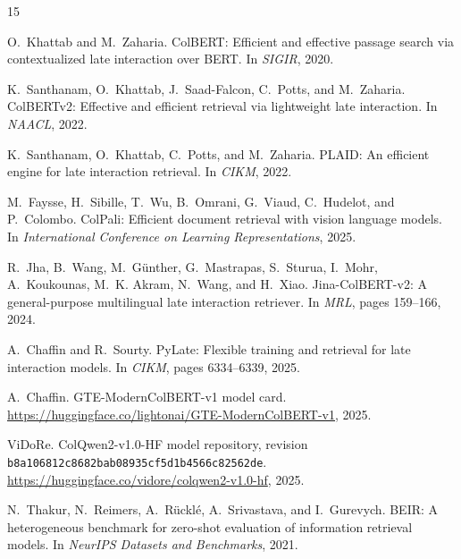 \documentclass{article}
\begin{document}
\begin{thebibliography}{15}

O.~Khattab and M.~Zaharia.
\newblock ColBERT: Efficient and effective passage search via contextualized
late interaction over BERT.
\newblock In \emph{SIGIR}, 2020.

K.~Santhanam, O.~Khattab, J.~Saad-Falcon, C.~Potts, and M.~Zaharia.
\newblock ColBERTv2: Effective and efficient retrieval via lightweight late
interaction.
\newblock In \emph{NAACL}, 2022.

K.~Santhanam, O.~Khattab, C.~Potts, and M.~Zaharia.
\newblock PLAID: An efficient engine for late interaction retrieval.
\newblock In \emph{CIKM}, 2022.

M.~Faysse, H.~Sibille, T.~Wu, B.~Omrani, G.~Viaud, C.~Hudelot, and P.~Colombo.
\newblock ColPali: Efficient document retrieval with vision language models.
\newblock In \emph{International Conference on Learning Representations},
2025.

R.~Jha, B.~Wang, M.~G\"unther, G.~Mastrapas, S.~Sturua, I.~Mohr,
A.~Koukounas, M.~K. Akram, N.~Wang, and H.~Xiao.
\newblock Jina-ColBERT-v2: A general-purpose multilingual late interaction
retriever.
\newblock In \emph{MRL}, pages 159--166, 2024.

A.~Chaffin and R.~Sourty.
\newblock PyLate: Flexible training and retrieval for late interaction
models.
\newblock In \emph{CIKM}, pages 6334--6339, 2025.

A.~Chaffin.
\newblock GTE-ModernColBERT-v1 model card.
\newblock \url{https://huggingface.co/lightonai/GTE-ModernColBERT-v1}, 2025.

ViDoRe.
\newblock ColQwen2-v1.0-HF model repository, revision
\texttt{b8a106812c8682bab08935cf5d1b4566c82562de}.
\newblock \url{https://huggingface.co/vidore/colqwen2-v1.0-hf}, 2025.

N.~Thakur, N.~Reimers, A.~R\"uckl\'e, A.~Srivastava, and I.~Gurevych.
\newblock BEIR: A heterogeneous benchmark for zero-shot evaluation of
information retrieval models.
\newblock In \emph{NeurIPS Datasets and Benchmarks}, 2021.


\end{thebibliography}
\end{document}
